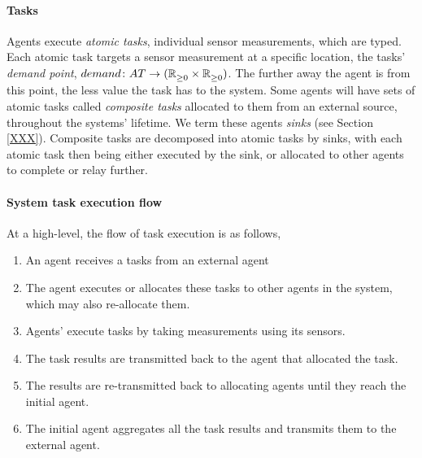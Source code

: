 \paragraph{Tasks}
\label{section:task_and_resources:tasks}
Agents execute \textit{atomic tasks}, individual sensor measurements, which are typed. Each atomic task targets a sensor measurement at a specific location, the tasks' \textit{demand point}, $\formalTaskDemandPoint{}{}$. The further away the agent is from this point, the less value the task has to the system. Some agents will have sets of atomic tasks called \textit{composite tasks} allocated to them from an external source, throughout the systems' lifetime. We term these agents \textit{sinks} (see Section \ref{XXX}). Composite tasks are decomposed into atomic tasks by sinks, with each atomic task then being either executed by the sink, or allocated to other agents to complete or relay further.

\paragraph{System task execution flow}

At a high-level, the flow of task execution is as follows,
\begin{enumerate}
	\item An agent receives a tasks from an external agent
	\item The agent executes or allocates these tasks to other agents in the system, which may also re-allocate them.
	\item Agents' execute tasks by taking measurements using its sensors.
	\item The task results are transmitted back to the agent that allocated the task.
	\item The results are re-transmitted back to allocating agents until they reach the initial agent.
	\item The initial agent aggregates all the task results and transmits them to the external agent.
\end{enumerate}


\begin{example}
\end{example}

